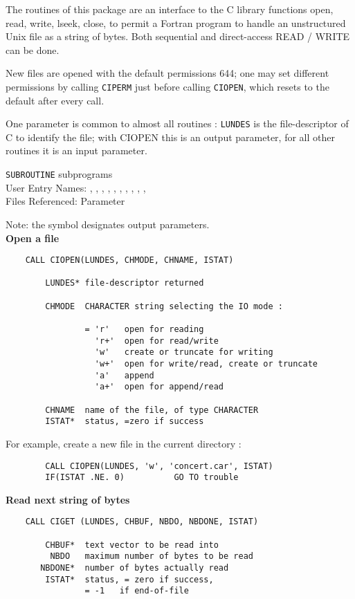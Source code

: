                               
         
\Submitter{}                                 
                       
 
The routines of this package are an interface to the
C library functions open, read, write, lseek, close,
to permit a Fortran program to handle an unstructured
Unix file as a string of bytes.
Both sequential and direct-access READ / WRITE can be done.
 
New files are opened with the default permissions 644;
one may set different permissions by calling {\tt CIPERM}
just before calling {\tt CIOPEN}, which resets to the
default after every call.
 
One parameter is common to almost all routines :
{\tt LUNDES} is the file-descriptor of C to identify the file;
with CIOPEN this is an output parameter,
for all other routines it is an input parameter.
 
\Structure
{\tt SUBROUTINE} subprograms \\
User Entry Names:
, , ,
, ,
, , , ,
,  \\
Files Referenced: Parameter
 
\Usage
Note: the symbol {\tt *} designates output parameters. \\[2mm]
 
{\bf Open a file}
\begin{verbatim}
    CALL CIOPEN(LUNDES, CHMODE, CHNAME, ISTAT)
 
        LUNDES* file-descriptor returned
 
        CHMODE  CHARACTER string selecting the IO mode :
 
                = 'r'   open for reading
                  'r+'  open for read/write
                  'w'   create or truncate for writing
                  'w+'  open for write/read, create or truncate
                  'a'   append
                  'a+'  open for append/read
 
        CHNAME  name of the file, of type CHARACTER
        ISTAT*  status, =zero if success
\end{verbatim}
   For example, create a new file in the current directory :
\begin{verbatim}
        CALL CIOPEN(LUNDES, 'w', 'concert.car', ISTAT)
        IF(ISTAT .NE. 0)          GO TO trouble
\end{verbatim}
\newpage
{\bf Read next string of bytes}
\begin{verbatim}
    CALL CIGET (LUNDES, CHBUF, NBDO, NBDONE, ISTAT)
 
        CHBUF*  text vector to be read into
         NBDO   maximum number of bytes to be read
       NBDONE*  number of bytes actually read
        ISTAT*  status, = zero if success,
                = -1   if end-of-file
\end{verbatim}
 
